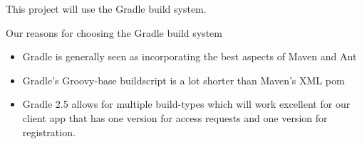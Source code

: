 This project will use the Gradle build system.


Our reasons for choosing the Gradle build system
\begin{itemize}
	\item Gradle is generally seen as incorporating the best aspects of Maven and Ant
	\item Gradle's Groovy-base buildscript is a lot shorter than Maven's XML pom
	\item Gradle 2.5 allows for multiple build-types which will work excellent for our client app that has one version for access requests and one version for registration.
	
\end{itemize}



